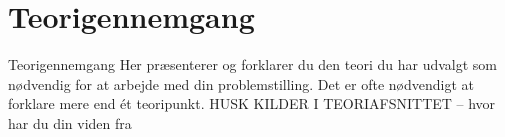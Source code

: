\section{Teorigennemgang}
Teorigennemgang Her præsenterer og forklarer du den teori du har udvalgt som
nødvendig for at arbejde med din problemstilling. Det er ofte nødvendigt at
forklare mere end ét teoripunkt. HUSK KILDER I TEORIAFSNITTET – hvor har du din
viden fra
